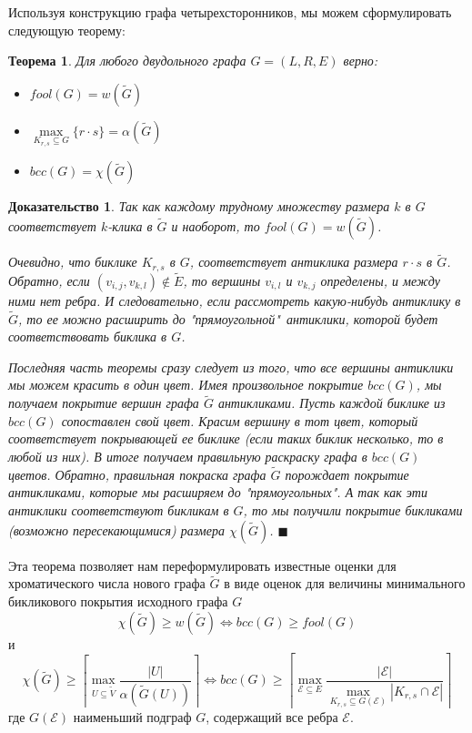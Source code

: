 \documentclass[a4paper]{article}
\newtheorem{mtheorem}{Теорема}[section]
\newtheorem*{msolution}{Доказательство}
\begin{document}
Используя конструкцию графа четырехсторонников, мы можем сформулировать следующую теорему:
\begin{mtheorem}
    Для любого двудольного графа $G = (L, R, E)$ верно:
    \begin{itemize}[noitemsep]
        \item[1)] $fool(G) = w(\widetilde{G})$
        \item[2)] $\max\limits_{K_{r,s}\subseteq G}\{r\cdot s\} = \alpha(\widetilde{G})$
        \item[3)] $bcc(G) = \chi(\widetilde{G})$
    \end{itemize}
\end{mtheorem}



\begin{msolution}
    Так как каждому трудному множеству размера $k$ в $G$ соответствует $k$-клика в $\widetilde{G}$ и 
    наоборот, то $fool(G) = w(\widetilde{G})$.
    
    Очевидно, что биклике $K_{r,s}$ в $G$, соответствует антиклика размера $r\cdot s$ в $\widetilde{G}$. 
    Обратно, если $(v_{i,j}, v_{k,l}) \notin \widetilde{E}$, то вершины $v_{i, l}$ и $v_{k, j}$ 
    определены, и между ними нет ребра. И следовательно, если рассмотреть какую-нибудь антиклику в 
    $\widetilde{G}$, то ее можно расширить до "прямоугольной"\  антиклики, которой будет соответствовать 
    биклика в $G$.
    
    Последняя часть теоремы сразу следует из того, что все вершины антиклики мы можем красить в один цвет. Имея 
    произвольное покрытие $bcc(G)$, мы получаем покрытие вершин графа $\widetilde{G}$ антикликами. 
    Пусть каждой биклике из $bcc(G)$ сопоставлен свой цвет. Красим вершину в тот цвет, который соответствует 
    покрывающей ее биклике (если таких биклик несколько, то в любой из них). В итоге получаем правильную 
    раскраску графа в $bcc(G)$ цветов. Обратно, правильная покраска графа $\widetilde{G}$ порождает 
    покрытие антикликами, которые мы расширяем до "прямоугольных". А так как эти антиклики
    соответствуют бикликам в $G$, то мы получили покрытие бикликами (возможно пересекающимися) 
    размера $\chi(\widetilde{G})$. $\blacksquare$
\end{msolution}

Эта теорема позволяет нам  переформулировать известные оценки для хроматического числа нового графа 
$\widetilde G$ в виде оценок для величины минимального бикликового покрытия исходного графа $G$
$$ \chi(\widetilde{G}) \geq w(\widetilde{G}) \Longleftrightarrow bcc(G) \geq fool(G)$$
и $$\chi(\widetilde{G}) \geq \left\lceil\max\limits_{U\subseteq \widetilde{V}}\frac{|U|}{\alpha(\widetilde{G}(U))}\right\rceil 
\Longleftrightarrow bcc(G) \geq \left\lceil\max\limits_{\mathcal{E}\subseteq E}\frac{|\mathcal{E}|}
{\max\limits_{K_{r,s}\subseteq G(\mathcal{E})}|K_{r,s}\cap\mathcal{E}|}\right\rceil$$ где $G(\mathcal{E})$ наименьший подграф $G$, 
содержащий все ребра $\mathcal{E}$. 
\end{document}
